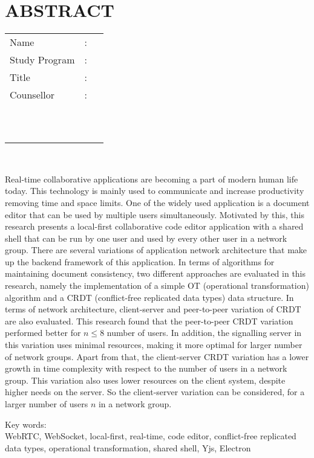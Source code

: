 %
%
%

\chapter*{ABSTRACT}
\singlespacing

\vspace*{0.2cm}

\def\blank{}

\noindent \begin{tabular}{l l p{11.0cm}}
	Name&: & \penulis \\
	Study Program&: & \studyProgram \\
	Title&: & \judulInggris \\
	Counsellor&: & \pembimbingSatu \\
	\ifx\blank\pembimbingDua
	\else
		\ &\ & \pembimbingDua \\
	\fi
	\ifx\blank\pembimbingTiga
	\else
		\ &\ & \pembimbingTiga \\
	\fi
\end{tabular} \\

\vspace*{0.5cm}

\noindent Real-time collaborative applications are becoming a part of modern human life today. This technology is mainly used to communicate and increase productivity removing time and space limits. One of the widely used application is a document editor that can be used by multiple users simultaneously. Motivated by this, this research presents a local-first collaborative code editor application with a shared shell that can be run by one user and used by every other user in a network group. There are several variations of application network architecture that make up the backend framework of this application. In terms of algorithms for maintaining document consistency, two different approaches are evaluated in this research, namely the implementation of a simple OT (operational transformation) algorithm and a CRDT (conflict-free replicated data types) data structure. In terms of network architecture, client-server and peer-to-peer variation of CRDT are also evaluated. This research found that the peer-to-peer CRDT variation performed better for $n \leq 8$ number of users. In addition, the signalling server in this variation uses minimal resources, making it more optimal for larger number of network groups. Apart from that, the client-server CRDT variation has a lower growth in time complexity with respect to the number of users in a network group. This variation also uses lower resources on the client system, despite higher needs on the server. So the client-server variation can be considered, for a larger number of users $n$ in a network group. \\

\vspace*{0.2cm}

\noindent Key words: \\ WebRTC, WebSocket, local-first, real-time, code editor, conflict-free replicated data types, operational transformation, shared shell, Yjs, Electron \\

\newpage
